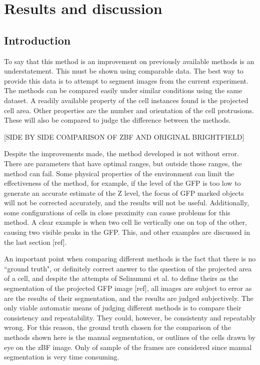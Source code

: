 
\chapter{Results and discussion}

\ifpdf
    \graphicspath{{Chapter5/Figs/Raster/}{Chapter5/Figs/PDF/}{Chapter5/Figs/}}
\else
    \graphicspath{{Chapter5/Figs/Vector/}{Chapter5/Figs/}}
\fi

\section{Introduction}

To say that this method is an improvement on previously available methods is an understatement. This must be shown using comparable data. The best way to provide this data is to attempt to segment images from the current experiment. The methods can be compared easily under similar conditions using the same dataset. A readily available property of the cell instances found is the projected cell area. Other properties are the number and orientation of the cell protrusions. These will also be compared to judge the difference between the methods.

[SIDE BY SIDE COMPARISON OF ZBF AND ORIGINAL BRIGHTFIELD]

Despite the improvements made, the method developed is not without error. There are parameters that have optimal ranges, but outside those ranges, the method can fail. Some physical properties of the environment can limit the effectiveness of the method, for example, if the level of the GFP is too low to generate an accurate estimate of the Z level, the focus of GFP marked objects will not be corrected accurately, and the results will not be useful. Additionally, some configurations of cells in close proximity can cause problems for this method. A clear example is when two cell lie vertically one on top of the other, causing two visible peaks in the GFP. This, and other examples are discussed in the last section [ref].

An important point when comparing different methods is the fact that there is no ``ground truth", or definitely correct answer to the question of the projected area of a cell, and despite the attempts of Selinummi et al. to define theirs as the segmentation of the projected GFP image [ref], all images are subject to error as are the results of their segmentation, and the results are judged subjectively. The only viable automatic means of judging different methods is to compare their consistency and repeatability. They could, however, be consistenty and repeatably wrong. For this reason, the ground truth chosen for the comparison of the methods shown here is the manual segmentation, or outlines of the cells drawn by eye on the zBF image. Only of sample of the frames are considered since manual segmentation is very time consuming.


